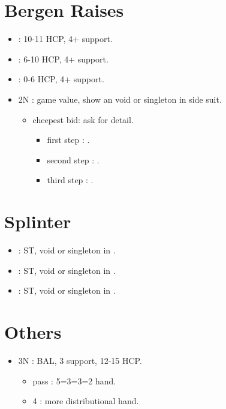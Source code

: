 \documentclass[12pt,twoside,a5paper]{report}%
\begin{document}
	\section*{Bergen Raises}
	\begin{itemize}
	\renewcommand{\labelitemi}{}
	\item {} : 10-11 HCP, 4+\he{} support.
	\item {} : 6-10 HCP, 4+\he{} support.
	\item {} : 0-6 HCP, 4+\he{} support.
	\item 2N : game value, show an void or singleton in side suit.
		\begin{itemize}
		\renewcommand{\labelitemi}{--}
		\item cheepest bid: ask for detail.
			\begin{itemize}
			\renewcommand{\labelitemi}{--}
				\item first step : \cl{}.
				\item second step : \di{}.
				\item third step : \sp{}.
			\end{itemize}
		\end{itemize}
	\end{itemize}

	\section*{Splinter}
	\begin{itemize}
	\renewcommand{\labelitemi}{}
	\item {} : ST, void or singleton in \cl{}.
	\item {} : ST, void or singleton in \di{}.
	\item {} : ST, void or singleton in \sp{}.
	\end{itemize}

	\section*{Others}
	\begin{itemize}
	\renewcommand{\labelitemi}{}
	\item 3N : BAL, 3\he{} support, 12-15 HCP.
		\begin{itemize}
		\renewcommand{\labelitemi}{--}
		\item pass : 5=3=3=2 hand.
		\item 4\he{} : more distributional hand.
		\end{itemize}
	\end{itemize}
	
\end{document}

